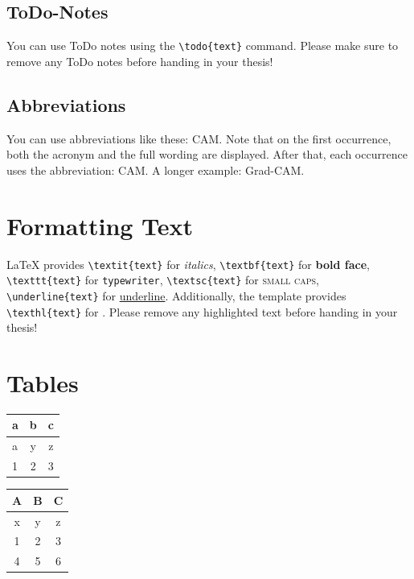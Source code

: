 \subsection{ToDo-Notes}
You can use ToDo notes using the \texttt{\textbackslash todo\{text\}}  command. Please make sure to remove any ToDo notes before handing in your thesis! 

\subsection{Abbreviations}
You can use abbreviations like these: \gls{CAM}. Note that on the first occurrence, both the acronym and the full wording are displayed. After that, each occurrence uses the abbreviation: \gls{CAM}. A longer example: \gls{Grad-CAM}.

\section{Formatting Text}
\LaTeX \- provides \texttt{\textbackslash textit\{text\}} for \textit{italics}, \texttt{\textbackslash textbf\{text\}} for \textbf{bold face}, \texttt{\textbackslash texttt\{text\}} for \texttt{typewriter}, \texttt{\textbackslash textsc\{text\}} for \textsc{small caps}, \texttt{\textbackslash underline\{text\}} for \underline{underline}. Additionally, the template provides  \texttt{\textbackslash texthl\{text\}} for . Please remove any highlighted text before handing in your thesis!

\section{Tables}

\begin{table}[caption={Table Example 1}, label=tab:table1]
    \centering
        \begin{tabular}{|l|cc|}
            \hline
            \hline
                a & b & c \\
            \hline
            \hline
                a & y  & z \\
            \hline
                1 & 2 & 3 \\
            \hline
            \hline
        \end{tabular}
\end{table}

\begin{table}[caption={Table Example 2}, label=tab:table2]
	\centering
		\begin{tabular}{c c c}
			\toprule
			{\bf A} & {\bf B} & {\bf C} \\ \midrule
			    x & y & z \\
                1 & 2 & 3 \\
                4 & 5 & 6 \\
			\midrule
		\end{tabular}
\end{table}

